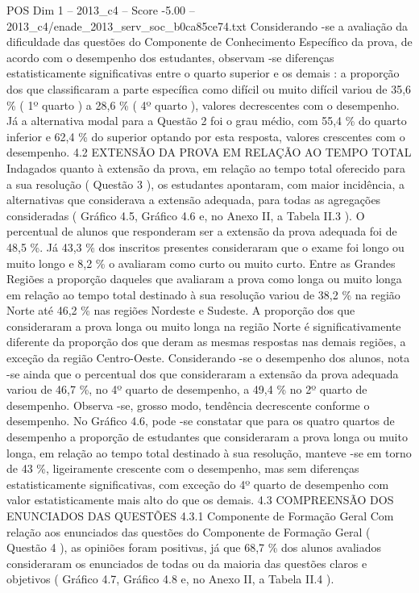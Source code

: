 \begin{textsample}{POS Dim 1 – 2013\_c4 – Score -5.00 – 2013\_c4/enade\_2013\_serv\_soc\_b0ca85ce74.txt}
Considerando -se a avaliação da dificuldade das questões do Componente de Conhecimento Específico da prova, de acordo com o desempenho dos estudantes, observam -se diferenças estatisticamente significativas entre o quarto superior e os demais : a proporção dos que classificaram a parte específica como difícil ou muito difícil variou de 35,6 \% ( 1º quarto ) a 28,6 \% ( 4º quarto ), valores decrescentes com o desempenho.
Já a alternativa modal para a Questão 2 foi o grau médio, com 55,4 \% do quarto inferior e 62,4 \% do superior optando por esta resposta, valores crescentes com o desempenho. 4.2 EXTENSÃO DA PROVA EM RELAÇÃO AO TEMPO TOTAL Indagados quanto à extensão da prova, em relação ao tempo total oferecido para a sua resolução ( Questão 3 ), os estudantes apontaram, com maior incidência, a alternativas que considerava a extensão adequada, para todas as agregações consideradas ( Gráfico 4.5, Gráfico 4.6 e, no Anexo II, a Tabela II.3 ).
O percentual de alunos que responderam ser a extensão da prova adequada foi de 48,5 \%.
Já 43,3 \% dos inscritos presentes consideraram que o exame foi longo ou muito longo e 8,2 \% o avaliaram como curto ou muito curto.
Entre as Grandes Regiões a proporção daqueles que avaliaram a prova como longa ou muito longa em relação ao tempo total destinado à sua resolução variou de 38,2 \% na região Norte até 46,2 \% nas regiões Nordeste e Sudeste.
A proporção dos que consideraram a prova longa ou muito longa na região Norte é significativamente diferente da proporção dos que deram as mesmas respostas nas demais regiões, a exceção da região Centro-Oeste.
Considerando -se o desempenho dos alunos, nota -se ainda que o percentual dos que consideraram a extensão da prova adequada variou de 46,7 \%, no 4º quarto de desempenho, a 49,4 \% no 2º quarto de desempenho.
Observa -se, grosso modo, tendência decrescente conforme o desempenho.
No Gráfico 4.6, pode -se constatar que para os quatro quartos de desempenho a proporção de estudantes que consideraram a prova longa ou muito longa, em relação ao tempo total destinado à sua resolução, manteve -se em torno de 43 \%, ligeiramente crescente com o desempenho, mas sem diferenças estatisticamente significativas, com exceção do 4º quarto de desempenho com valor estatisticamente mais alto do que os demais. 4.3 COMPREENSÃO DOS ENUNCIADOS DAS QUESTÕES 4.3.1 Componente de Formação Geral Com relação aos enunciados das questões do Componente de Formação Geral ( Questão 4 ), as opiniões foram positivas, já que 68,7 \% dos alunos avaliados consideraram os enunciados de todas ou da maioria das questões claros e objetivos ( Gráfico 4.7, Gráfico 4.8 e, no Anexo II, a Tabela II.4 ).

\end{textsample}
